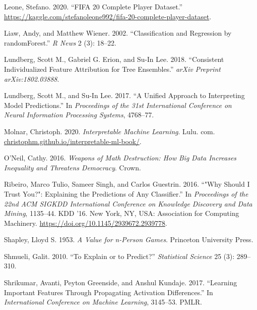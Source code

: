 \documentclass[
]{article}
\newlength{\cslhangindent}
\newlength{\cslentryspacingunit} %
\newenvironment{CSLReferences}[2] %
 {%
  \setlength{\parindent}{0pt}
  \ifodd #1
  \let\oldpar\par
  \def\par{\hangindent=\cslhangindent\oldpar}
  \fi
  \setlength{\parskip}{#2\cslentryspacingunit}
 }%
 {}
\begin{document}
\begin{CSLReferences}{1}{0}
\leavevmode{}%
Leone, Stefano. 2020. {``{FIFA} 20 Complete Player Dataset.''} \url{https://kaggle.com/stefanoleone992/fifa-20-complete-player-dataset}.

\leavevmode{}%
Liaw, Andy, and Matthew Wiener. 2002. {``Classification and Regression by {randomForest}.''} \emph{R News} 2 (3): 18--22.

\leavevmode{}%
Lundberg, Scott M., Gabriel G. Erion, and Su-In Lee. 2018. {``Consistent Individualized Feature Attribution for Tree Ensembles.''} \emph{arXiv Preprint arXiv:1802.03888}.

\leavevmode{}%
Lundberg, Scott M., and Su-In Lee. 2017. {``A Unified Approach to Interpreting Model Predictions.''} In \emph{Proceedings of the 31st International Conference on Neural Information Processing Systems}, 4768--77.

\leavevmode{}%
Molnar, Christoph. 2020. \emph{Interpretable Machine Learning}. Lulu. com. \href{https://christophm.github.io/interpretable-ml-book/}{christophm.github.io/interpretable-ml-book/}.

\leavevmode{}%
O'Neil, Cathy. 2016. \emph{Weapons of Math Destruction: {How} Big Data Increases Inequality and Threatens Democracy}. Crown.

\leavevmode{}%
Ribeiro, Marco Tulio, Sameer Singh, and Carlos Guestrin. 2016. {``"{Why} {Should} {I} {Trust} {You}?": {Explaining} the {Predictions} of {Any} {Classifier}.''} In \emph{Proceedings of the 22nd {ACM} {SIGKDD} {International} {Conference} on {Knowledge} {Discovery} and {Data} {Mining}}, 1135--44. {KDD} '16. New York, NY, USA: Association for Computing Machinery. \url{https://doi.org/10.1145/2939672.2939778}.

\leavevmode{}%
Shapley, Lloyd S. 1953. \emph{A Value for n-Person Games}. Princeton University Press.

\leavevmode{}%
Shmueli, Galit. 2010. {``To Explain or to Predict?''} \emph{Statistical Science} 25 (3): 289--310.

\leavevmode{}%
Shrikumar, Avanti, Peyton Greenside, and Anshul Kundaje. 2017. {``Learning Important Features Through Propagating Activation Differences.''} In \emph{International {Conference} on {Machine} {Learning}}, 3145--53. PMLR.


\end{CSLReferences}
\end{document}
